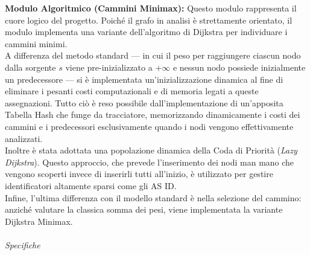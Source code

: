 \documentclass[12pt, a4paper]{article}
\begin{document}
{\large\textbf{Modulo Algoritmico (Cammini Minimax):}} Questo modulo rappresenta il cuore logico del progetto. Poiché il grafo in analisi è strettamente orientato, il modulo implementa una variante dell'algoritmo di Dijkstra per individuare i cammini minimi. \\
A differenza del metodo standard — in cui il peso per raggiungere ciascun nodo dalla sorgente $s$ viene pre-inizializzato a $+\infty$ e nessun nodo possiede inizialmente un predecessore — si è implementata un'inizializzazione dinamica al fine di eliminare i pesanti costi computazionali e di memoria legati a queste assegnazioni. Tutto ciò è reso possibile dall'implementazione di un'apposita Tabella Hash che funge da tracciatore, memorizzando dinamicamente i costi dei cammini e i predecessori esclusivamente quando i nodi vengono effettivamente analizzati. \\
Inoltre è stata adottata una popolazione dinamica della Coda di Priorità (\textit{Lazy Dijkstra}). Questo approccio, che prevede l'inserimento dei nodi man mano che vengono scoperti invece di inserirli tutti all'inizio, è utilizzato per gestire identificatori altamente sparsi come gli AS ID. \\
Infine, l'ultima differenza con il modello standard è nella selezione del cammino: anziché valutare la classica somma dei pesi, viene implementata la variante Dijkstra Minimax.\\ \\
{\large \textit{Specifiche}}
\end{document}
